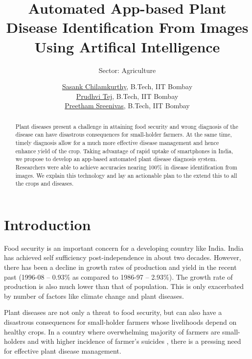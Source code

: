 \documentclass[a4paper]{scrartcl}
\begin{document}
\title{Automated App-based Plant Disease Identification From Images Using Artifical Intelligence}
\subtitle{Sector: Agriculture}
\author{
\href{mailto:sasankchilamkurthy@gmail.com}{Sasank Chilamkurthy}, B.Tech, IIT Bombay\\
\href{mailto:prudhvitej.immadi@gmail.com}{Prudhvi Tej}, B.Tech, IIT Bombay\\
\href{mailto:preethamsreenivas@gmail.com}{Preetham Sreenivas}, B.Tech, IIT Bombay
}

\maketitle

\begin{abstract}
Plant diseases present a challenge in attaining food security and wrong diagnosis of the disease can have disastrous consequences for small-holder farmers. 
At the same time, timely diagnosis allow for a much more effective disease management and hence enhance yield of the crop.
Taking advantage of rapid uptake of smartphones in India, we propose to develop an app-based automated plant disease diagnosis system. 
Researchers were able to achieve accuracies nearing 100\% in disease identification from images.
We explain this technology and lay an actionable plan to the extend this to all the crops and diseases.


\end{abstract}

\section{Introduction}
Food security is an important concern for a developing country like India.
India has achieved self sufficiency post-independence in about two decades.
However, there has been a decline in growth rates of production and yield in the recent past (1996-08 -- 0.93\% as compared to 1986-97 -- 2.93\%). 
The growth rate of production is also much lower than that of population\cite{dev2010food}.
This is only exacerbated by number of factors like climate change\cite{tai2014threat} and plant diseases\cite{strange2005plant}.

Plant diseases are not only a threat to food security, but can also have a disastrous consequences for small-holder farmers whose livelihoods depend on healthy crops. 
In a country where overwhelming majority of farmers are small-holders\cite{ifad2013smallholders} and with higher incidence of farmer's suicides \cite{mishra2014}, 
there is a pressing need for effective plant disease management.
\end{document}
